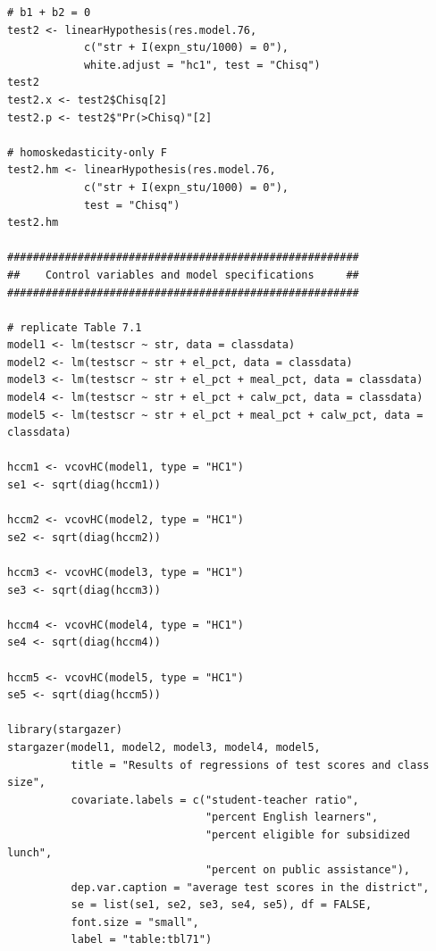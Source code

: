 \documentclass[11pt]{article}
\begin{document}
\begin{verbatim}
# b1 + b2 = 0
test2 <- linearHypothesis(res.model.76,
            c("str + I(expn_stu/1000) = 0"),
            white.adjust = "hc1", test = "Chisq")
test2
test2.x <- test2$Chisq[2]
test2.p <- test2$"Pr(>Chisq)"[2]

# homoskedasticity-only F
test2.hm <- linearHypothesis(res.model.76,
            c("str + I(expn_stu/1000) = 0"),
            test = "Chisq")
test2.hm

#######################################################
##    Control variables and model specifications     ##
#######################################################

# replicate Table 7.1
model1 <- lm(testscr ~ str, data = classdata)
model2 <- lm(testscr ~ str + el_pct, data = classdata)
model3 <- lm(testscr ~ str + el_pct + meal_pct, data = classdata)
model4 <- lm(testscr ~ str + el_pct + calw_pct, data = classdata)
model5 <- lm(testscr ~ str + el_pct + meal_pct + calw_pct, data = classdata)

hccm1 <- vcovHC(model1, type = "HC1")
se1 <- sqrt(diag(hccm1))

hccm2 <- vcovHC(model2, type = "HC1")
se2 <- sqrt(diag(hccm2))

hccm3 <- vcovHC(model3, type = "HC1")
se3 <- sqrt(diag(hccm3))

hccm4 <- vcovHC(model4, type = "HC1")
se4 <- sqrt(diag(hccm4))

hccm5 <- vcovHC(model5, type = "HC1")
se5 <- sqrt(diag(hccm5))

library(stargazer)
stargazer(model1, model2, model3, model4, model5,
          title = "Results of regressions of test scores and class size",
          covariate.labels = c("student-teacher ratio",
                               "percent English learners",
                               "percent eligible for subsidized lunch",
                               "percent on public assistance"),
          dep.var.caption = "average test scores in the district",
          se = list(se1, se2, se3, se4, se5), df = FALSE,
          font.size = "small",
          label = "table:tbl71")
\end{verbatim}




\end{document}
